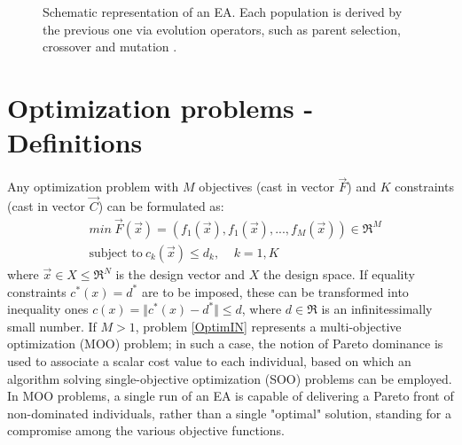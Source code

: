 \begin{figure}[h!]
\begin{minipage}[b]{1\linewidth}
 \centering
\end{minipage}
\caption{Schematic representation of an EA. Each population is derived by the previous one via evolution operators, such as parent selection, crossover and mutation .} 
\label{EA}
\end{figure}


\section{Optimization problems - Definitions}
\label{OPt_def}
Any optimization problem with $M$ objectives (cast in vector $\vec{F}$) and $K$ constraints (cast in vector $\vec{C}$) can be formulated as:
\begin{align} 
   &min ~ \vec{F}(\vec{x})=(f_1(\vec{x}),f_1(\vec{x}),...,f_M(\vec{x}))\in \Re^{M} \nonumber \\
   &\mbox{subject to} ~ c_k(\vec{x})\leq d_k, ~~~~~ k =1,K
\label{OptimIN}
\end{align}
where $\vec{x}\in X \!\leq\! \Re^{N}$ is the design vector and $X$ the design space. If equality constraints $ c^*(x)=d^* $ are to be imposed, these can be transformed into inequality ones $ c(x)=\Vert c^*(x)-d^*\Vert \leq d $, where $ d \in \Re $ is an infinitessimally small number. If $M \!> \!1$, problem \ref{OptimIN} represents a multi-objective optimization (MOO) problem; in such a case, the notion of Pareto dominance \cite{Zitzler2000} is used to associate a scalar cost value to each individual, based on which an algorithm solving single-objective optimization (SOO) problems can be employed. In MOO problems, a single run of an EA is capable of delivering a Pareto front of non-dominated individuals, rather than a single "optimal" solution, standing for a compromise among the various objective functions. 

